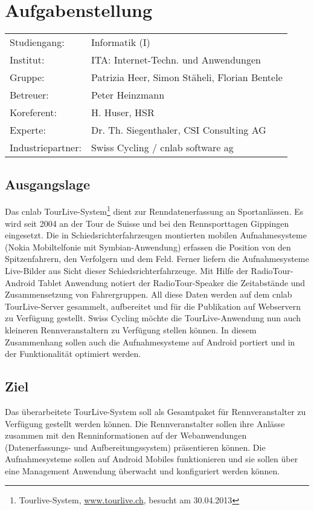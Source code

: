 \chapter*{Aufgabenstellung}

\begin{tabular}{ll}
	Studiengang: & Informatik (I) \\
	Institut: & ITA: Internet-Techn. und Anwendungen \\
	Gruppe: & Patrizia Heer, Simon Stäheli, Florian Bentele \\
	Betreuer: & Peter Heinzmann  \\
	Koreferent: & H. Huser, HSR \\
	Experte: & Dr. Th. Siegenthaler, CSI Consulting AG  \\
	Industriepartner: & Swiss Cycling / cnlab software ag \\    
   
\end{tabular}
\section*{Ausgangslage}
Das cnlab TourLive-System\footnote{Tourlive-System, \url{www.tourlive.ch}, besucht am 30.04.2013} dient zur Renndatenerfassung an Sportanlässen. Es wird seit 2004 an der Tour de Suisse und bei den Rennsporttagen Gippingen eingesetzt. Die in Schiedsrichterfahrzeugen montierten mobilen Aufnahmesysteme (Nokia Mobiltelfonie mit Symbian-Anwendung) erfassen die Position von den Spitzenfahrern, den Verfolgern und dem Feld. Ferner liefern die Aufnahmesysteme Live-Bilder aus Sicht dieser Schiedsrichterfahrzeuge. Mit Hilfe der RadioTour-Android Tablet Anwendung notiert der RadioTour-Speaker die Zeitabstände und Zusammensetzung von Fahrergruppen. All diese Daten werden auf dem cnlab TourLive-Server gesammelt, aufbereitet und für die Publikation auf Webservern zu Verfügung gestellt. 
Swiss Cycling möchte die TourLive-Anwendung nun auch kleineren Rennveranstaltern zu Verfügung stellen können. In diesem Zusammenhang sollen auch die Aufnahmesysteme auf Android portiert und in der Funktionalität optimiert werden.

\section*{Ziel}
Das überarbeitete TourLive-System soll als Gesamtpaket für Rennveranstalter zu Verfügung gestellt werden können. Die Rennveranstalter sollen ihre Anlässe zusammen mit den Renninformationen auf der Webanwendungen (Datenerfassungs- und Aufbereitungssystem) präsentieren können. Die Aufnahmesysteme sollen auf Android Mobiles funktionieren und sie sollen über eine Management Anwendung überwacht und konfiguriert werden können.

